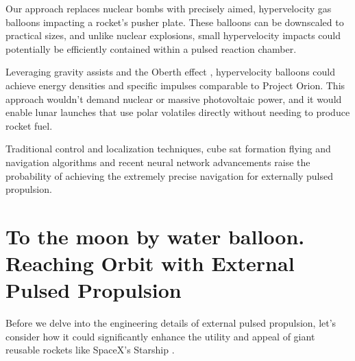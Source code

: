 \documentclass{article}
\begin{document}
Our approach replaces nuclear bombs with precisely aimed, hypervelocity gas balloons impacting a rocket's pusher plate. These balloons can be downscaled to practical sizes, and unlike nuclear explosions, small hypervelocity impacts could potentially be efficiently contained within a pulsed reaction chamber.

Leveraging gravity assists and the Oberth effect \cite{oberth_effect}, hypervelocity balloons could achieve energy densities and specific impulses comparable to Project Orion. This approach wouldn't demand nuclear or massive photovoltaic power, and it would enable lunar launches that use polar volatiles directly without needing to produce rocket fuel.     

Traditional control and localization techniques, cube sat formation flying and navigation algorithms and recent neural network advancements raise the probability of achieving the extremely precise navigation for externally pulsed propulsion.

\section{To the moon by water balloon.  Reaching Orbit with External Pulsed Propulsion}
Before we delve into the engineering details of external pulsed propulsion, let's consider how it could significantly enhance the utility and appeal of giant reusable rockets like SpaceX's Starship \cite{starship}.   
\end{document}
